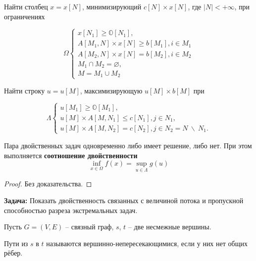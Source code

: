 	\begin{Def}
		Найти столбец $x = x[N]$, минимизирующий $c[N] \times x[N]$, где $|N| < + \infty$, при ограничениях 

		$$\Omega \begin{cases}
			x[N_1] \geqslant \mathbb{O}[N_1],\\
			A[M_1, N] \times x[N] \geqslant b[M_1], i \in M_1\\
			A[M_2, N] \times x[N] = b[M_2], i \in M_2 \\
			M_1 \cap M_2 = \varnothing,\\
			M = M_1 \cup M_2
		\end{cases}$$
	\end{Def}

	\begin{Def}
		Найти строку $u = u[M]$, максимизирующую $u[M] \times b[M]$ при 

		$$\Lambda \begin{cases}
			u[M_1] \geqslant \mathbb{O}[M_1],\\
			u[M] \times A[M, N_1] \leqslant c[N_1], j \in N_1,\\
			u[M] \times A[M, N_2] = c[N_2], j \in N_2 = N \ \backslash \ N_1.
		\end{cases}
		$$ 
		
	\end{Def}

	\begin{Thm}
		Пара двойственных задач одновременно либо имеет решение, либо нет.
		При этом выполняется \textbf{соотношение двойственности}
		$$ \inf_{x\in \Omega} f(x) = \sup_{u \in \Lambda} g(u)$$
	\end{Thm}

	\begin{proof}
		Без доказательства.
	\end{proof}

	\textbf{Задача:} Показать двойственность связанных с величиной потока и пропускной способностью разреза экстремальных задач.


	Пусть $G = (V, E)$ -- связный граф, $s$, $t$ -- две несмежные вершины.

	\begin{Def}
		Пути из $s$ в $t$ называются вершинно-непересекающимися, если у них нет общих рёбер.
	\end{Def}

